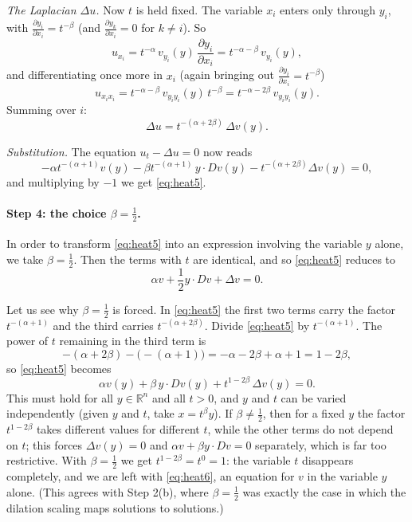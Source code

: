 \documentclass[11pt]{article}
\theoremstyle{plain}
\theoremstyle{definition}
\theoremstyle{remark}
\begin{document}
\emph{The Laplacian $\Delta u$.} Now $t$ is held fixed. The variable $x_i$ enters only through $y_i$, with $\frac{\partial y_i}{\partial x_i} = t^{-\beta}$ (and $\frac{\partial y_k}{\partial x_i} = 0$ for $k \neq i$). So
$$ u_{x_i} = t^{-\alpha}\, v_{y_i}(y)\,\frac{\partial y_i}{\partial x_i} = t^{-\alpha-\beta}\, v_{y_i}(y), $$
and differentiating once more in $x_i$ (again bringing out $\frac{\partial y_i}{\partial x_i} = t^{-\beta}$)
$$ u_{x_ix_i} = t^{-\alpha-\beta}\, v_{y_iy_i}(y)\, t^{-\beta} = t^{-\alpha-2\beta}\, v_{y_iy_i}(y). $$
Summing over $i$:
$$ \Delta u = t^{-(\alpha+2\beta)}\,\Delta v(y). $$

\emph{Substitution.} The equation $u_t - \Delta u = 0$ now reads
$$ -\alpha t^{-(\alpha+1)} v(y) - \beta t^{-(\alpha+1)}\, y\cdot Dv(y) - t^{-(\alpha+2\beta)}\Delta v(y) = 0, $$
and multiplying by $-1$ we get \eqref{eq:heat5}.

\paragraph{Step 4: the choice $\beta = \frac12$.}
In order to transform \eqref{eq:heat5} into an expression involving the variable $y$ alone, we take $\beta = \frac12$. Then the terms with $t$ are identical, and so \eqref{eq:heat5} reduces to
\begin{equation}\label{eq:heat6}
\alpha v + \frac12 y\cdot Dv + \Delta v = 0.
\end{equation}

Let us see why $\beta = \frac12$ is forced. In \eqref{eq:heat5} the first two terms carry the factor $t^{-(\alpha+1)}$ and the third carries $t^{-(\alpha+2\beta)}$. Divide \eqref{eq:heat5} by $t^{-(\alpha+1)}$. The power of $t$ remaining in the third term is
$$ -(\alpha+2\beta) - \big(-(\alpha+1)\big) = -\alpha - 2\beta + \alpha + 1 = 1 - 2\beta, $$
so \eqref{eq:heat5} becomes
$$ \alpha v(y) + \beta\, y\cdot Dv(y) + t^{1-2\beta}\,\Delta v(y) = 0. $$
This must hold for all $y \in \mathbb{R}^n$ and all $t > 0$, and $y$ and $t$ can be varied independently (given $y$ and $t$, take $x = t^\beta y$). If $\beta \neq \frac12$, then for a fixed $y$ the factor $t^{1-2\beta}$ takes different values for different $t$, while the other terms do not depend on $t$; this forces $\Delta v(y) = 0$ and $\alpha v + \beta y\cdot Dv = 0$ separately, which is far too restrictive. With $\beta = \frac12$ we get $t^{1-2\beta} = t^0 = 1$: the variable $t$ disappears completely, and we are left with \eqref{eq:heat6}, an equation for $v$ in the variable $y$ alone. (This agrees with Step 2(b), where $\beta = \frac12$ was exactly the case in which the dilation scaling maps solutions to solutions.)
\end{document}
